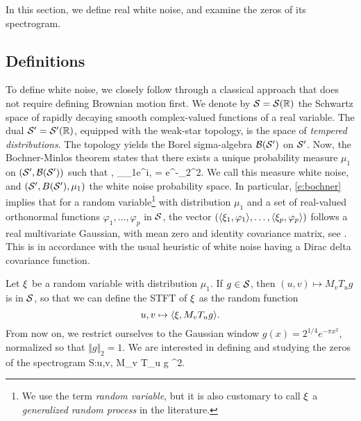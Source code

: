 In this section, we define real white noise, and examine the zeros of its
spectrogram. 
\subsection{Definitions}

To define white noise, we closely follow \cite[Chapter 2.1]{HOUZ10} through a
classical approach that does not require defining Brownian motion first. We denote by $\mathcal{S}=\mathcal{S}(\mathbb{R})$
the Schwartz space of rapidly decaying smooth complex-valued functions of a real
variable. The dual $\mathcal{S}'=\mathcal{S}'(\mathbb{R})$, equipped with the weak-star
topology, is the space of \emph{tempered distributions}. The topology yields the
Borel sigma-algebra $\mathcal{B}(\mathcal{S}')$ on $\mathcal{S}'$. Now, the Bochner-Minlos
theorem \citep[Theorem 2.1.1]{HOUZ10} states that there exists a unique probability
measure $\mu_1$ on $(\mathcal{S}',\mathcal{B}(\mathcal{S}'))$ such that 
\beq
\forall \phi\in \cS, \quad {}_{\mu_1}e^{i\langle \cdot,\phi \rangle} =
e^{-\Vert \phi\Vert_2^2}.
\label{e:bochner}
\eeq
We call this measure white noise, and $(\mathcal{S}',B(\mathcal{S}'),\mu_1)$ the white noise
probability space. In particular, \eqref{e:bochner}
implies that for a random variable\footnote{We use the term \emph{random variable}, but it is also customary to call $\xi$ a \emph{generalized random process} in the literature.} with distribution
$\mu_1$ and a set of real-valued orthonormal functions $\varphi_1,\dots,\varphi_p$ in $\mathcal{S}$, the vector
$(\langle \xi_1,\varphi_1 \rangle,\dots,\langle \xi_p,\varphi_p \rangle)$
follows a real multivariate Gaussian, with mean zero and identity covariance matrix,
see \cite[Lemma 2.1.2]{HOUZ10}. This is in accordance with the usual heuristic of white noise having a Dirac delta covariance function.

Let $\xi$ be a random variable with distribution $\mu_1$.
If $g\in\mathcal{S}$, then $(u,v)\mapsto M_v T_u g$ is in $\mathcal{S}$, so that we can define
the STFT of $\xi$ as the random function
$$ u,v\mapsto \langle \xi,  M_v T_u g \rangle.$$
From now on, we restrict ourselves to the Gaussian window $g(x) =
2^{1/4}e^{-\pi x^2}$, normalized so that $\Vert g\Vert_2 = 1$. We are interested
in defining and studying the zeros of the spectrogram
\beq
\label{e:spectrogram}
S:u,v\mapsto \vert \langle \fomega,  M_v T_u g \rangle\vert^2.
\eeq

